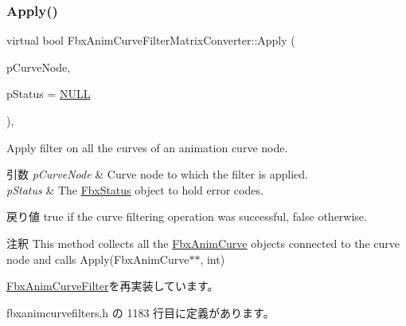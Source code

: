\subsubsection{\texorpdfstring{Apply()}{Apply()}\hspace{0.1cm}{\footnotesize\ttfamily [1/7]}}
{\footnotesize\ttfamily virtual bool Fbx\+Anim\+Curve\+Filter\+Matrix\+Converter\+::\+Apply (\begin{DoxyParamCaption}\item[{\hyperlink{class_fbx_anim_curve_node}{Fbx\+Anim\+Curve\+Node} \&}]{p\+Curve\+Node,  }\item[{\hyperlink{class_fbx_status}{Fbx\+Status} $\ast$}]{p\+Status = {\ttfamily \hyperlink{fbxarch_8h_a070d2ce7b6bb7e5c05602aa8c308d0c4}{N\+U\+LL}} }\end{DoxyParamCaption})\hspace{0.3cm}{\ttfamily [inline]}, {\ttfamily [virtual]}}

Apply filter on all the curves of an animation curve node. 
\begin{DoxyParams}{引数}
{\em p\+Curve\+Node} & Curve node to which the filter is applied. \\
\hline
{\em p\+Status} & The \hyperlink{class_fbx_status}{Fbx\+Status} object to hold error codes. \\
\hline
\end{DoxyParams}
\begin{DoxyReturn}{戻り値}
{\ttfamily true} if the curve filtering operation was successful, {\ttfamily false} otherwise. 
\end{DoxyReturn}
\begin{DoxyRemark}{注釈}
This method collects all the \hyperlink{class_fbx_anim_curve}{Fbx\+Anim\+Curve} objects connected to the curve node and calls Apply(\+Fbx\+Anim\+Curve$\ast$$\ast$, int) 
\end{DoxyRemark}


\hyperlink{class_fbx_anim_curve_filter_ad042b45c0675278fa49e61739b0825c2}{Fbx\+Anim\+Curve\+Filter}を再実装しています。



 fbxanimcurvefilters.\+h の 1183 行目に定義があります。

\mbox{\label{class_fbx_anim_curve_filter_matrix_converter_a20db5fcf27096c750a9b5bfc1ed074e4}} 
